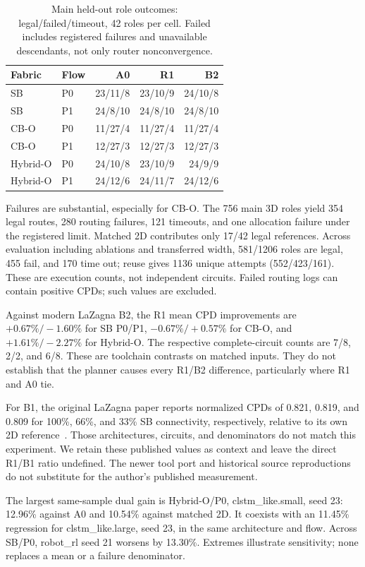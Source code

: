 \documentclass[conference,10pt]{IEEEtran}
\begin{document}
\begin{table}[h]
\centering\caption{Main held-out role outcomes: legal/failed/timeout, 42 roles per cell. Failed includes registered failures and unavailable descendants, not only router nonconvergence.}
\label{tab:coverage}
\begin{tabular}{llrrr}\hline
Fabric&Flow&A0&R1&B2\\\hline
SB&P0&23/11/8&23/10/9&24/10/8\\
SB&P1&24/8/10&24/8/10&24/8/10\\
CB-O&P0&11/27/4&11/27/4&11/27/4\\
CB-O&P1&12/27/3&12/27/3&12/27/3\\
Hybrid-O&P0&24/10/8&23/10/9&24/9/9\\
Hybrid-O&P1&24/12/6&24/11/7&24/12/6\\\hline
\end{tabular}
\end{table}
Failures are substantial, especially for CB-O. The 756 main 3D roles yield 354 legal routes, 280 routing failures, 121 timeouts, and one allocation failure under the registered limit. Matched 2D contributes only 17/42 legal references. Across evaluation including ablations and transferred width, 581/1206 roles are legal, 455 fail, and 170 time out; reuse gives 1136 unique attempts (552/423/161). These are execution counts, not independent circuits. Failed routing logs can contain positive CPDs; such values are excluded.

Against modern LaZagna B2, the R1 mean CPD improvements are $+0.67\%/-1.60\%$ for SB P0/P1, $-0.67\%/+0.57\%$ for CB-O, and $+1.61\%/-2.27\%$ for Hybrid-O. The respective complete-circuit counts are 7/8, 2/2, and 6/8. These are toolchain contrasts on matched inputs. They do not establish that the planner causes every R1/B2 difference, particularly where R1 and A0 tie.

For B1, the original LaZagna paper reports normalized CPDs of 0.821, 0.819, and 0.809 for 100\%, 66\%, and 33\% SB connectivity, respectively, relative to its own 2D reference~\cite{lazagnav1}. Those architectures, circuits, and denominators do not match this experiment. We retain these published values as context and leave the direct R1/B1 ratio undefined. The newer tool port and historical source reproductions do not substitute for the author's published measurement.

The largest same-sample dual gain is Hybrid-O/P0, clstm\_like.small, seed 23: 12.96\% against A0 and 10.54\% against matched 2D. It coexists with an 11.45\% regression for clstm\_like.large, seed 23, in the same architecture and flow. Across SB/P0, robot\_rl seed 21 worsens by 13.30\%. Extremes illustrate sensitivity; none replaces a mean or a failure denominator.
\end{document}
